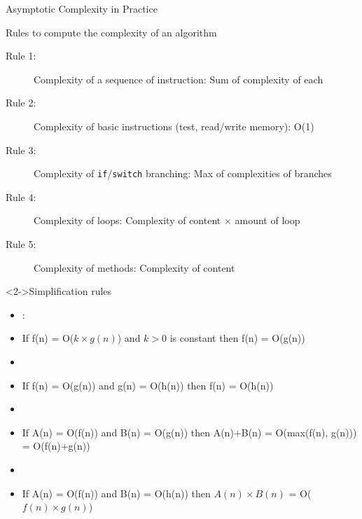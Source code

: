 \begin{frame}{Asymptotic Complexity in Practice}
  \begin{block}{Rules to compute the complexity of an algorithm}
    \begin{description}
    \item[Rule 1:] Complexity of a sequence of instruction: Sum of
      complexity of each
    \item[Rule 2:] Complexity of basic instructions (test, read/write
      memory): O(1)
    \item[Rule 3:] Complexity of \texttt{if}/\texttt{switch}
      branching: Max of complexities of branches
    \item[Rule 4:] Complexity of loops: Complexity of content $\times$
      amount of loop
    \item[Rule 5:] Complexity of methods: Complexity of content
    \end{description}
  \end{block}\vspace{-.5\baselineskip}

  \begin{block}<2->{Simplification rules}\vspace{-.3\baselineskip}
    \begin{itemize}
    \item {}:
    \item[] If f(n) = O({\small $k\times g(n)$}) 
            and $k>0$ is constant
            then f(n) = O(\small{g(n)})
    \item {}
    \item[] If f(n) = O({\small g(n)}) 
            and g(n) = O({\small h(n)}) 
            then f(n) = O(\small{h(n)})
    \item {}
    \item[] If A(n) = O({\small f(n)}) 
            and B(n) = O({\small g(n)}) 
            then A(n)+B(n) = O(\small{max({\footnotesize f(n), g(n)})})\\
            \hspace{77.7mm}= O({\small f(n)+g(n)})\vspace{-.7\baselineskip}
    \item {}
    \item[] If A(n) = O({\small f(n)}) 
            and B(n) = O({\small h(n)}) 
            then $A(n)\times B(n)$ = O({\small $f(n)\times g(n)$})
    \end{itemize}
  \end{block}
\end{frame}
